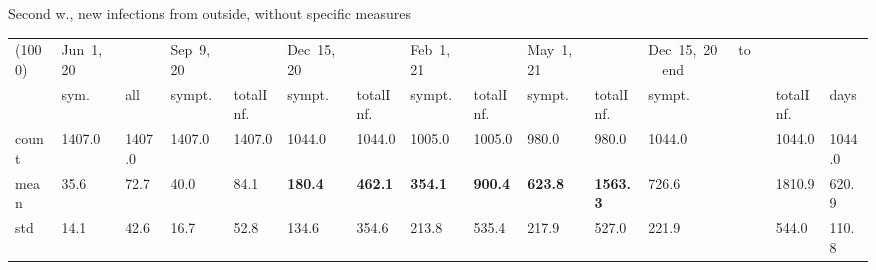 \documentclass[8pt]{beamer}
\begin{document}
\begin{frame}{Second w., new infections from outside, without specific measures}
\begin{table}[H]
\center
\tiny
\begin{tabular}{p{0.3cm}p{0.3cm}p{0.3cm}p{0.3cm}p{0.3cm}p{0.3cm}p{0.3cm}p{0.3cm}p{0.3cm}p{0.3cm}p{0.3cm}p{0.3cm}p{0.3cm}p{0.4cm}}
\toprule
(1000) &  Jun~1,~20 & &  Sep~9,~20 & & Dec~15,~20 & & Feb~1,~21 & & May~1,~21 & & Dec~15,~20~~~to~~~end   \\
{} &  sym. &  all &  sympt. &  totalInf. &  sympt. &  totalInf. &  sympt. &  totalInf. &  sympt. &  totalInf. &  sympt. &  totalInf.  & days\\
\midrule
count &   1407.0 &                     1407.0 &   1407.0 &                     1407.0 &   1044.0 &                     1044.0 &   1005.0 &                     1005.0 &    980.0 &                      980.0 &              1044.0 &                  1044.0 & 1044.0 \\
mean  &     35.6 &                       72.7 &     40.0 &                       84.1 &    \textbf{180.4} &                      \textbf{462.1} &    \textbf{354.1} &                      \textbf{900.4} &    \textbf{623.8} &                     \textbf{1563.3} &               726.6 &                  1810.9 &  620.9 \\
std   &     14.1 &                       42.6 &     16.7 &                       52.8 &    134.6 &                      354.6 &    213.8 &                      535.4 &    217.9 &                      527.0 &               221.9 &                   544.0 &  110.8 \\
\bottomrule
\end{tabular}

\label{selForceWave2Tab}
\end{table}


\end{frame}
\end{document}
